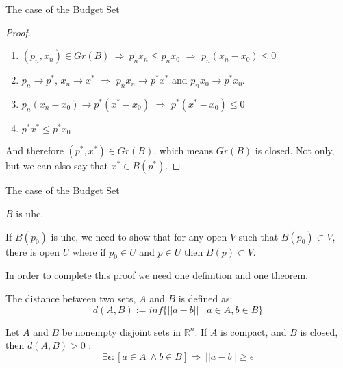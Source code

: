 \documentclass[aspectratio=169]{beamer}
\begin{document}
\begin{frame}{The case of the Budget Set}
    \begin{proof}
    \begin{enumerate}
        \item $(p_n,x_n)\in Gr(B)\ \Rightarrow\ p_n x_n \leq p_n x_0$ $\Rightarrow$ $p_n(x_n-x_0)\leq 0$
        \item $p_n\rightarrow p^*$, $x_n\rightarrow x^*$ $\Rightarrow$ $p_nx_n\rightarrow p^*x^*$ and $p_nx_0\rightarrow p^*x_0$.
        \item $p_n(x_n-x_0)\rightarrow p^*(x^*-x_0)$ $\Rightarrow$ $p^*(x^*-x_0)\leq 0$
        \item $p^*x^*\leq p^*x_0$
    \end{enumerate}
    
    And therefore $(p^*,x^*)\in Gr(B)$, which means $Gr(B)$ is closed. Not only, but we can also say that $x^*\in B(p^*)$.
    \end{proof}
\end{frame}

\begin{frame}{The case of the Budget Set}
    \begin{theorem}
        $B$ is uhc.
    \end{theorem}

    If $B(p_0)$ is uhc, we need to show that for any open $V$ such that $B(p_0)\subset V$, there is open $U$ where if $p_0\in U$ and $p\in U$ then $B(p)\subset V$.

\end{frame}

\begin{frame}
    In order to complete this proof we need one definition and one theorem.

    \begin{definition}
        The distance between two sets, $A$ and $B$ is defined as: \[d(A,B):=inf\{||a-b|| \mid a\in A, b\in B\}\]
    \end{definition}

    \begin{theorem}
        Let $A$ and $B$ be nonempty disjoint sets in $\mathds{R}^n$. If $A$ is compact, and $B$ is closed, then $d(A,B)>0$ : \[\exists \epsilon : [a\in A\ \wedge b\in B]\Rightarrow\ ||a-b||\geq \epsilon\]
    \end{theorem}
\end{frame}
\end{document}
